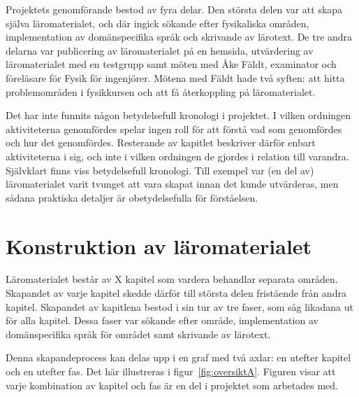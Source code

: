 \begin{draft}

Projektets genomförande bestod av fyra delar. Den största delen var att skapa själva läromaterialet, och där ingick sökande efter fysikaliska områden, implementation av domänspecifika språk och skrivande av lärotext. De tre andra delarna var publicering av läromaterialet på en hemsida, utvärdering av läromaterialet med en testgrupp samt möten med Åke Fäldt, examinator och föreläsare för Fysik för ingenjörer. Mötena med Fäldt hade två syften: att hitta problemområden i fysikkursen och att få återkoppling på läromaterialet.

Det har inte funnits någon betydelsefull kronologi i projektet. I vilken ordningen aktiviteterna genomfördes spelar ingen roll för att förstå vad som genomfördes och hur det genomfördes. Resterande av kapitlet beskriver därför enbart aktiviteterna i sig, och inte i vilken ordningen de gjordes i relation till varandra. Självklart finns viss betydelsefull kronologi. Till exempel var (en del av) läromaterialet varit tvunget att vara skapat innan det kunde utvärderas, men sådana praktiska detaljer är obetydelsefulla för förståelsen.

\section{Konstruktion av läromaterialet}

Läromaterialet består av X kapitel som vardera behandlar separata
områden. Skapandet av varje kapitel skedde därför till största delen fristående
från andra kapitel. Skapandet av kapitlena bestod i sin tur av tre faser,
som såg likadana ut för alla kapitel. Dessa faser var sökande efter område,
implementation av domänspecifika språk för området samt skrivande av lärotext.

Denna skapandeprocess kan delas upp i en graf med två axlar: en utefter kapitel och en
utefter fas. Det här illustreras i figur~\ref{fig:oversiktA}. Figuren visar att
varje kombination av kapitel och fas är en del i projektet som arbetades med.


\end{draft}
